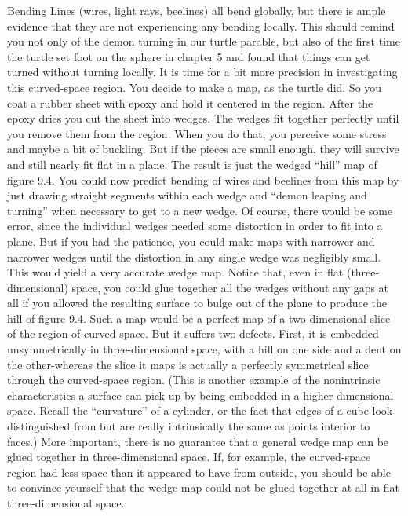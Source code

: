 \documentclass{book}
\begin{document}
Bending Lines (wires, light rays, beelines) all bend globally, but there is
ample evidence that they are not experiencing any bending locally. This
should remind you not only of the demon turning in our turtle parable,
but also of the first time the turtle set foot on the sphere in chapter 5
and found that things can get turned without turning locally.
It is time for a bit more precision in investigating this curved-space
region. You decide to make a map, as the turtle did. So you coat a
rubber sheet with epoxy and hold it centered in the region. After the
epoxy dries you cut the sheet into wedges. The wedges fit together
perfectly until you remove them from the region. When you do that,
you perceive some stress and maybe a bit of buckling. But if the pieces
are small enough, they will survive and still nearly fit flat in a plane.
The result is just the wedged ``hill'' map of figure 9.4. You could now
predict bending of wires and beelines from this map by just drawing
straight segments within each wedge and ``demon leaping and turning''
when necessary to get to a new wedge. Of course, there would be some
error, since the individual wedges needed some distortion in order to fit
into a plane. But if you had the patience, you could make maps with
narrower and narrower wedges until the distortion in any single wedge
was negligibly small. This would yield a very accurate wedge map.
Notice that, even in flat (three-dimensional) space, you could glue
together all the wedges without any gaps at all if you allowed the
resulting surface to bulge out of the plane to produce the hill of figure
9.4. Such a map would be a perfect map of a two-dimensional slice of the
region of curved space. But it suffers two defects. First, it is embedded
unsymmetrically in three-dimensional space, with a hill on one side and
a dent on the other-whereas the slice it maps is actually a perfectly
symmetrical slice through the curved-space region. (This is another example of the nonintrinsic characteristics a surface can pick up by being
embedded in a higher-dimensional space. Recall the ``curvature'' of a
cylinder, or the fact that edges of a cube look distinguished from but are
really intrinsically the same as points interior to faces.) More important,
there is no guarantee that a general wedge map can be glued together
in three-dimensional space. If, for example, the curved-space region had
less space than it appeared to have from outside, you should be able to
convince yourself that the wedge map could not be glued together at all
in flat three-dimensional space.
\end{document}
